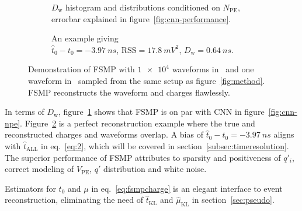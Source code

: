 \begin{figure}[H]
  \begin{subfigure}[b]{.45\textwidth}
    \centering
    \resizebox{1.05\textwidth}{!}{}
    \caption{\label{fig:fsmp-npe} $D_\mathrm{w}$ histogram and distributions conditioned on $N_{\mathrm{PE}}$, errorbar explained in figure~\ref{fig:cnn-performance}.}
  \end{subfigure}
  \hspace{0.5em}
  \begin{subfigure}[b]{.55\textwidth}
    \centering
    \resizebox{\textwidth}{!}{}
    \caption{\label{fig:fsmp} An example giving \\ $\hat{t}_0 - t_0=\SI{-3.97}{ns}$, $\mathrm{RSS}=\SI{17.8}{mV^2}$, $D_\mathrm{w}=\SI{0.64}{ns}$.}
  \end{subfigure}
  \caption{\label{fig:fsmp-performance}Demonstration of FSMP with $\num[retain-unity-mantissa=false]{1e4}$ waveforms in~ and one waveform in~ sampled from the same setup as figure~\ref{fig:method}.  FSMP reconstructs the waveform and charges flawlessly.}
\end{figure}
In terms of $D_\mathrm{w}$, figure~\ref{fig:fsmp-npe} shows that FSMP is on par with CNN in figure~\ref{fig:cnn-npe}.  Figure~\ref{fig:fsmp} is a perfect reconstruction example where the true and reconstructed charges and waveforms overlap.  A bias of $\hat{t}_0 - t_0=\SI{-3.97}{ns}$ aligns with $\hat{t}_\mathrm{ALL}$ in eq.~\eqref{eq:2}, which will be covered in section~\ref{subsec:timeresolution}.  The superior performance of FSMP attributes to sparsity and positiveness of $q'_i$, correct modeling of $V_\mathrm{PE}$, $q'$ distribution and white noise.

Estimators for $t_0$ and $\mu$ in eq.~\eqref{eq:fsmpcharge} is an elegant interface to event reconstruction, eliminating the need of $\hat{t}_\mathrm{KL}$ and $\hat{\mu}_\mathrm{KL}$ in section~\ref{sec:pseudo}.
